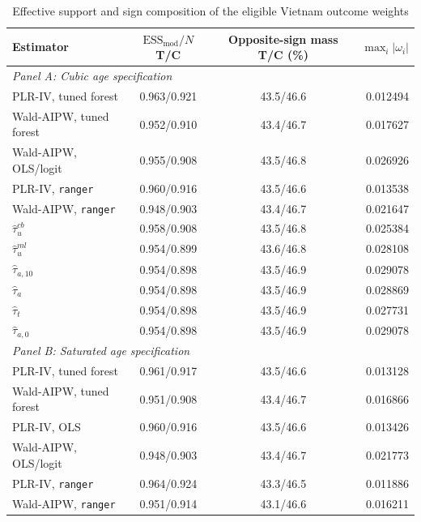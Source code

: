\documentclass[12pt, a4paper, oneside]{article}
\theoremstyle{plain}
\theoremstyle{definition}
\begin{document}
\begin{table}[H]
\centering
\caption{Effective support and sign composition of the eligible Vietnam outcome weights}
\label{tab:vietnam_weight_concentration_appendix}
\scriptsize
\setlength{\tabcolsep}{5pt}
\renewcommand{\arraystretch}{0.91}
\begin{threeparttable}
\begin{tabular}{@{}l c c r@{}}
\toprule
Estimator
& $\mathrm{ESS}_{\mathrm{mod}}/N$ T/C
& Opposite-sign mass T/C (\%)
& $\max_i|\omega_i|$ \\
\midrule

\multicolumn{4}{l}{\textit{Panel A: Cubic age specification}} \\[1pt]
PLR-IV, tuned forest
& 0.963/0.921 & 43.5/46.6 & 0.012494 \\
Wald-AIPW, tuned forest
& 0.952/0.910 & 43.4/46.7 & 0.017627 \\
Wald-AIPW, OLS/logit
& 0.955/0.908 & 43.5/46.8 & 0.026926 \\
PLR-IV, \texttt{ranger}
& 0.960/0.916 & 43.5/46.6 & 0.013538 \\
Wald-AIPW, \texttt{ranger}
& 0.948/0.903 & 43.4/46.7 & 0.021647 \\[1pt]

$\widehat{\tau}_{u}^{cb}$
& 0.958/0.908 & 43.5/46.8 & 0.025384 \\
$\widehat{\tau}_{u}^{ml}$
& 0.954/0.899 & 43.6/46.8 & 0.028108 \\
$\widehat{\tau}_{a,10}$
& 0.954/0.898 & 43.5/46.9 & 0.029078 \\
$\widehat{\tau}_{a}$
& 0.954/0.898 & 43.5/46.9 & 0.028869 \\
$\widehat{\tau}_{t}$
& 0.954/0.898 & 43.5/46.9 & 0.027731 \\
$\widehat{\tau}_{a,0}$
& 0.954/0.898 & 43.5/46.9 & 0.029078 \\[3pt]

\multicolumn{4}{l}{\textit{Panel B: Saturated age specification}} \\[1pt]
PLR-IV, tuned forest
& 0.961/0.917 & 43.5/46.6 & 0.013128 \\
Wald-AIPW, tuned forest
& 0.951/0.908 & 43.4/46.7 & 0.016866 \\
PLR-IV, OLS
& 0.960/0.916 & 43.5/46.6 & 0.013426 \\
Wald-AIPW, OLS/logit
& 0.948/0.903 & 43.4/46.7 & 0.021773 \\
PLR-IV, \texttt{ranger}
& 0.964/0.924 & 43.3/46.5 & 0.011886 \\
Wald-AIPW, \texttt{ranger}
& 0.951/0.914 & 43.1/46.6 & 0.016211 \\[1pt]


\end{tabular}
\end{threeparttable}
\end{table}
\end{document}

